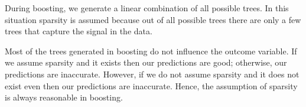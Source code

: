 \documentclass[11pt]{article}
\begin{document}
\vspace{5 mm}
\noindent
During boosting, we generate a linear combination of all possible trees. In 
this situation sparsity is assumed because out of all possible trees there are 
only a few trees that capture the signal in the data. 

\vspace{5 mm}
\noindent
Most of the trees generated in boosting do not influence the outcome variable. 
If we assume sparsity and it exists then our predictions are good; otherwise, 
our predictions are inaccurate. However, if we do not assume sparsity and it 
does not exist even then our predictions are inaccurate.  Hence, the assumption 
of sparsity is always reasonable in boosting.



\vspace{5 mm}
\noindent
\end{document}
